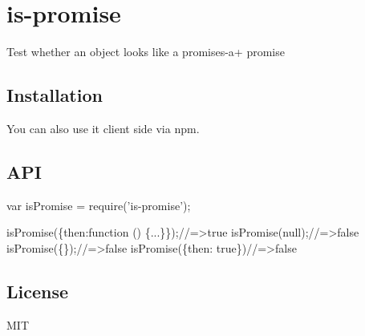 \href{http://promises-aplus.github.com/promises-spec}{\tt } \section*{is-\/promise}

Test whether an object looks like a promises-\/a+ promise

\href{https://travis-ci.org/then/is-promise}{\tt } \href{https://gemnasium.com/then/is-promise}{\tt } \href{https://www.npmjs.org/package/is-promise}{\tt }

\subsection*{Installation}



You can also use it client side via npm.

\subsection*{A\+PI}


\begin{DoxyCode}
var isPromise = require('is-promise');

isPromise(\{then:function () \{...\}\});//=>true
isPromise(null);//=>false
isPromise(\{\});//=>false
isPromise(\{then: true\})//=>false
\end{DoxyCode}


\subsection*{License}

M\+IT 